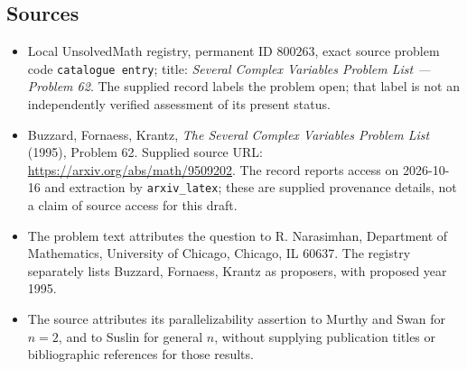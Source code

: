 \documentclass[11pt]{article}
\begin{document}
\subsection{Sources}
\begin{itemize}
\item Local UnsolvedMath registry, permanent ID \(800263\), exact source problem code \texttt{catalogue entry}; title: \emph{Several Complex Variables Problem List --- Problem 62}. The supplied record labels the problem open; that label is not an independently verified assessment of its present status.
\item Buzzard, Fornaess, Krantz, \emph{The Several Complex Variables Problem List} (1995), Problem 62. Supplied source URL: \url{https://arxiv.org/abs/math/9509202}. The record reports access on 2026-10-16 and extraction by \texttt{arxiv\_latex}; these are supplied provenance details, not a claim of source access for this draft.
\item The problem text attributes the question to R. Narasimhan, Department of Mathematics, University of Chicago, Chicago, IL 60637. The registry separately lists Buzzard, Fornaess, Krantz as proposers, with proposed year 1995.
\item The source attributes its parallelizability assertion to Murthy and Swan for \(n=2\), and to Suslin for general \(n\), without supplying publication titles or bibliographic references for those results.
\end{itemize}
\end{document}
